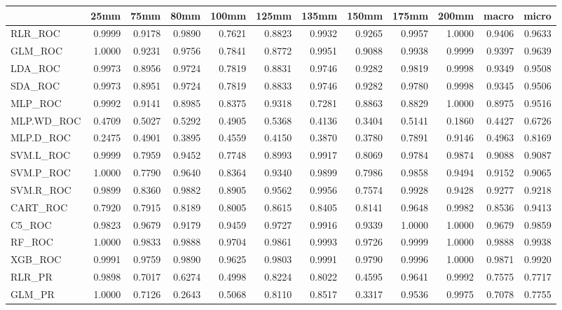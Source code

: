 \documentclass[
]{article}
\begin{document}
\begin{longtable}[]{@{}lrrrrrrrrrrr@{}}
\toprule()
& 25mm & 75mm & 80mm & 100mm & 125mm & 135mm & 150mm & 175mm & 200mm &
macro & micro \\
\midrule()
\endhead
RLR\_ROC & 0.9999 & 0.9178 & 0.9890 & 0.7621 & 0.8823 & 0.9932 & 0.9265
& 0.9957 & 1.0000 & 0.9406 & 0.9633 \\
GLM\_ROC & 1.0000 & 0.9231 & 0.9756 & 0.7841 & 0.8772 & 0.9951 & 0.9088
& 0.9938 & 0.9999 & 0.9397 & 0.9639 \\
LDA\_ROC & 0.9973 & 0.8956 & 0.9724 & 0.7819 & 0.8831 & 0.9746 & 0.9282
& 0.9819 & 0.9998 & 0.9349 & 0.9508 \\
SDA\_ROC & 0.9973 & 0.8951 & 0.9724 & 0.7819 & 0.8833 & 0.9746 & 0.9282
& 0.9780 & 0.9998 & 0.9345 & 0.9506 \\
MLP\_ROC & 0.9992 & 0.9141 & 0.8985 & 0.8375 & 0.9318 & 0.7281 & 0.8863
& 0.8829 & 1.0000 & 0.8975 & 0.9516 \\
MLP.WD\_ROC & 0.4709 & 0.5027 & 0.5292 & 0.4905 & 0.5368 & 0.4136 &
0.3404 & 0.5141 & 0.1860 & 0.4427 & 0.6726 \\
MLP.D\_ROC & 0.2475 & 0.4901 & 0.3895 & 0.4559 & 0.4150 & 0.3870 &
0.3780 & 0.7891 & 0.9146 & 0.4963 & 0.8169 \\
SVM.L\_ROC & 0.9999 & 0.7959 & 0.9452 & 0.7748 & 0.8993 & 0.9917 &
0.8069 & 0.9784 & 0.9874 & 0.9088 & 0.9087 \\
SVM.P\_ROC & 1.0000 & 0.7790 & 0.9640 & 0.8364 & 0.9340 & 0.9899 &
0.7986 & 0.9858 & 0.9494 & 0.9152 & 0.9065 \\
SVM.R\_ROC & 0.9899 & 0.8360 & 0.9882 & 0.8905 & 0.9562 & 0.9956 &
0.7574 & 0.9928 & 0.9428 & 0.9277 & 0.9218 \\
CART\_ROC & 0.7920 & 0.7915 & 0.8189 & 0.8005 & 0.8615 & 0.8405 & 0.8141
& 0.9648 & 0.9982 & 0.8536 & 0.9413 \\
C5\_ROC & 0.9823 & 0.9679 & 0.9179 & 0.9459 & 0.9727 & 0.9916 & 0.9339 &
1.0000 & 1.0000 & 0.9679 & 0.9859 \\
RF\_ROC & 1.0000 & 0.9833 & 0.9888 & 0.9704 & 0.9861 & 0.9993 & 0.9726 &
0.9999 & 1.0000 & 0.9888 & 0.9938 \\
XGB\_ROC & 0.9991 & 0.9759 & 0.9890 & 0.9625 & 0.9803 & 0.9991 & 0.9790
& 0.9996 & 1.0000 & 0.9871 & 0.9920 \\
RLR\_PR & 0.9898 & 0.7017 & 0.6274 & 0.4998 & 0.8224 & 0.8022 & 0.4595 &
0.9641 & 0.9992 & 0.7575 & 0.7717 \\
GLM\_PR & 1.0000 & 0.7126 & 0.2643 & 0.5068 & 0.8110 & 0.8517 & 0.3317 &
0.9536 & 0.9975 & 0.7078 & 0.7755 \\

\end{longtable}
\end{document}
